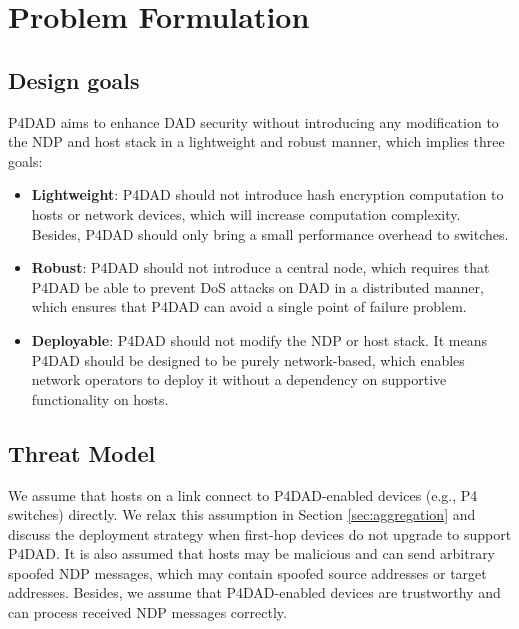 \documentclass[a4paper,fleqn]{cas-dc}
\begin{document}
\section{Problem Formulation}\label{sec:threat model and design goals}
    \subsection{Design goals}
        P4DAD aims to enhance DAD security without introducing any modification to the NDP and host stack in a lightweight and robust manner, which implies three goals:
        \begin{itemize}
            \item\textbf{Lightweight}: P4DAD should not introduce hash encryption computation to hosts or network devices, which will increase computation complexity. Besides, P4DAD should only bring a small performance overhead to switches.

            \item \textbf{Robust}: 
            P4DAD should not introduce a central node, which requires that P4DAD be able to prevent DoS attacks on DAD in a distributed manner, which ensures that P4DAD can avoid a single point of failure problem.

            \item \textbf{Deployable}: 
            P4DAD should not modify the NDP or host stack. It means P4DAD should be designed to be purely network-based, which enables network operators to deploy it without a dependency on supportive functionality on hosts. 
        \end{itemize}


    \subsection{Threat Model}\label{sec:threat model}
        We assume that hosts on a link connect to P4DAD-enabled devices (e.g., P4 switches) directly. We relax this assumption in Section \ref{sec:aggregation} and discuss the deployment strategy when first-hop devices do not upgrade to support P4DAD.
        It is also assumed that hosts may be malicious and can send arbitrary spoofed NDP messages, which may contain spoofed source addresses or target addresses. Besides, we assume that P4DAD-enabled devices are trustworthy and can process received NDP messages correctly.
        
\end{document}
